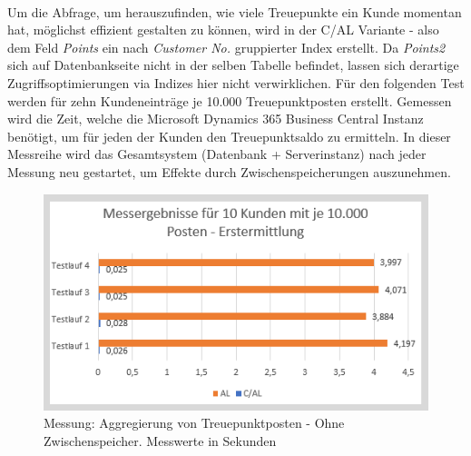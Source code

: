 \paragraph{}
Um die Abfrage, um herauszufinden, wie viele Treuepunkte ein Kunde momentan hat, möglichst effizient gestalten zu können, wird in der C/AL Variante - also dem Feld \textit{Points} ein nach \textit{Customer No.} gruppierter Index erstellt. Da \textit{Points2} sich auf Datenbankseite nicht in der selben Tabelle befindet, lassen sich derartige Zugriffsoptimierungen via Indizes hier nicht verwirklichen. Für den folgenden Test werden für zehn Kundeneinträge je 10.000 Treuepunktposten erstellt. Gemessen wird die Zeit, welche die Microsoft Dynamics 365 Business Central Instanz benötigt, um für jeden der Kunden den Treuepunktsaldo zu ermitteln. In dieser Messreihe wird das Gesamtsystem (Datenbank + Serverinstanz) nach jeder Messung neu gestartet, um Effekte durch Zwischenspeicherungen auszunehmen.

\begin{figure}[H]
	\centering
	\includegraphics[width=130mm]{images/Test2NoCache}
	\caption{Messung: Aggregierung von Treuepunktposten - Ohne Zwischenspeicher. Messwerte in Sekunden}
	\label{fig:Test2Schema}
\end{figure}

